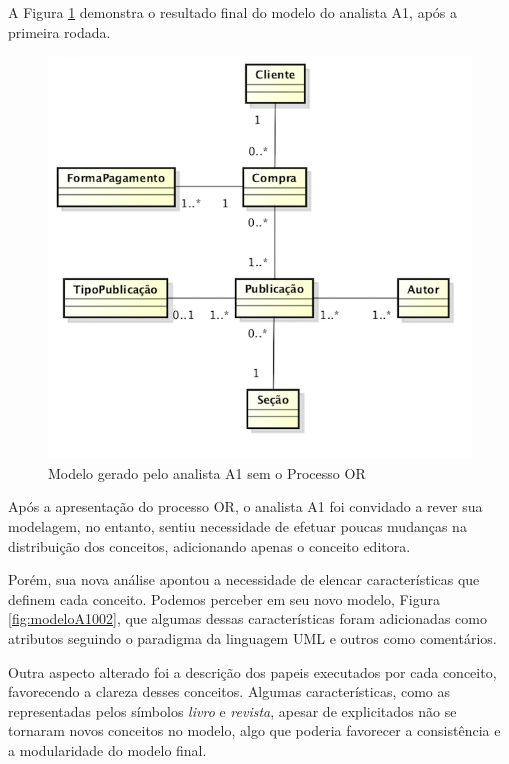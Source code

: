 A Figura \ref{fig:modeloA1001} demonstra o resultado final do modelo do analista A1, após a primeira rodada.

\begin{figure}[!ht]
    \centering
    \includegraphics[width=\textwidth]{imagens/Modelo_001_Aline_Macena.png}
    \caption{Modelo gerado pelo analista A1 sem o Processo OR}
    \label{fig:modeloA1001}
\end{figure}

Após a apresentação do processo OR, o analista A1 foi convidado a rever sua modelagem, no entanto, sentiu necessidade de efetuar poucas mudanças na distribuição dos conceitos, adicionando apenas o conceito editora.

Porém, sua nova análise apontou a necessidade de elencar características que definem cada conceito. Podemos perceber em seu novo modelo, Figura \ref{fig:modeloA1002}, que algumas dessas características foram adicionadas como atributos seguindo o paradigma da linguagem UML e outros como comentários.  

Outra aspecto alterado foi a descrição dos papeis executados por cada conceito, favorecendo a clareza desses conceitos. Algumas características, como as representadas pelos símbolos \textit{livro} e \textit{revista}, apesar de explicitados não se tornaram novos conceitos no modelo, algo que poderia favorecer a consistência e a modularidade do modelo final.

